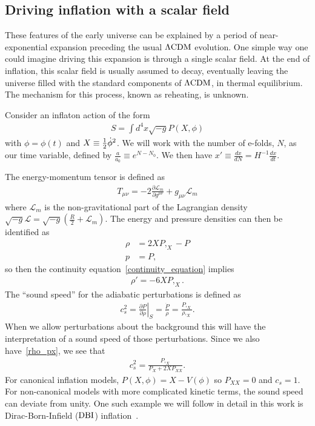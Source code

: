     \subsection{Driving inflation with a scalar field}
    These features of the early universe can be explained by a period of near-exponential expansion
    preceding the usual $\Lambda\text{CDM}$ evolution.
    One simple way one could imagine driving this expansion is through a single
    scalar field.
    At the end of inflation, this scalar field is usually assumed to decay,
    eventually leaving the universe filled with the standard components of $\Lambda\text{CDM}$,
    in thermal equilibrium. The mechanism for this process, known as reheating, is unknown.


Consider an inflaton action of the form
\begin{align}\label{inflaton_action}
S = \int d^4x \sqrt{-g}P(X,\phi)
\end{align}
with $\phi=\phi(t)$ and $X\equiv\frac{1}{2}\dot{\phi}^2$.
We will work with the number of e-folds, $N$, as our time variable,
defined by $\frac{a}{a_0}\equiv e^{N-N_0}$.
We then have
$x'\equiv\frac{dx}{dN}=H^{-1}\frac{dx}{dt}$.


The energy-momentum tensor is defined as
\begin{align}\label{gr_energy}
    T_{\mu\nu} = -2\frac{\partial\mathcal{L}_m}{\partial g^{\mu\nu}}+g_{\mu\nu}\mathcal{L}_m
\end{align}
where $\mathcal{L}_m$ is the non-gravitational part of the Lagrangian
density ${\sqrt{-g}\mathcal{L}=\sqrt{-g}\left(\frac{R}{2}+\mathcal{L}_m\right)}$.
The energy and pressure densities can then be identified as
\begin{align}\label{rho_px}
    \rho &= 2XP,_X-P\\
    p &= P,
\end{align}
so then the continuity equation~\eqref{continuity_equation} implies
\begin{align}\label{rho_deriv}
    \rho' = -6XP,_X.
\end{align}
    The ``sound speed'' for the adiabatic perturbations is defined as~\cite{Christopherson_2009}
    \begin{align}\label{sound_speed_definition}
        c_s^2 = \left. \frac{\partial P}{\partial \rho} \right|_S = \frac{\dot{P}}{\dot{\rho}}
        = \frac{P,_X}{\rho,_X}.
    \end{align}
    When we allow perturbations about the background this will have the interpretation
    of a sound speed of those perturbations.
    Since we also have~\eqref{rho_px}, we see that
    \begin{align}
        c_s^2 = \frac{P,_X}{P_X+2X P_{XX}}.
    \end{align}
    For canonical inflation models, $P(X,\phi)=X-V(\phi)$
    so $P_{XX}=0$ and $c_s=1$.
    For non-canonical models with more complicated kinetic terms,
    the sound speed can deviate from unity.
    One such example we will follow in detail in this work is
    Dirac-Born-Infield ($\text{DBI}$) inflation~\cite{dbi_in_the_sky}.



